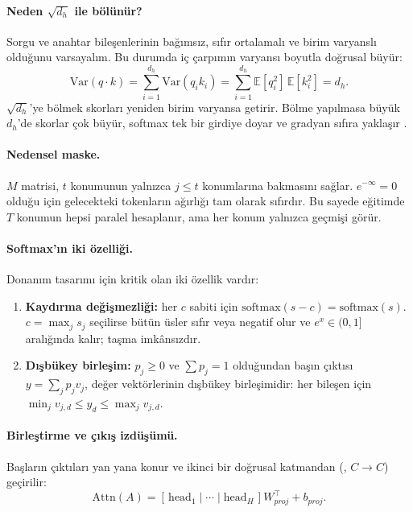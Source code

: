 \paragraph{Neden $\sqrt{d_h}$ ile bölünür?} Sorgu ve anahtar bileşenlerinin bağımsız, sıfır ortalamalı ve birim varyanslı olduğunu varsayalım. Bu durumda iç çarpımın varyansı boyutla doğrusal büyür:
\begin{equation}
  \mathrm{Var}(q \cdot k) = \sum_{i=1}^{d_h} \mathrm{Var}(q_i k_i) = \sum_{i=1}^{d_h} \mathbb{E}[q_i^2]\, \mathbb{E}[k_i^2] = d_h .
\end{equation}
$\sqrt{d_h}$'ye bölmek skorları yeniden birim varyansa getirir. Bölme yapılmasa büyük $d_h$'de skorlar çok büyür, softmax tek bir girdiye doyar ve gradyan sıfıra yaklaşır \cite{vaswani}.

\paragraph{Nedensel maske.} $M$ matrisi, $t$ konumunun yalnızca $j\le t$ konumlarına bakmasını sağlar. $e^{-\infty}=0$ olduğu için gelecekteki tokenların ağırlığı tam olarak sıfırdır. Bu sayede eğitimde $T$ konumun hepsi paralel hesaplanır, ama her konum yalnızca geçmişi görür.

\paragraph{Softmax'ın iki özelliği.} Donanım tasarımı için kritik olan iki özellik vardır:
\begin{enumerate}
  \item \textbf{Kaydırma değişmezliği:} her $c$ sabiti için $\mathrm{softmax}(s-c) = \mathrm{softmax}(s)$. $c = \max_j s_j$ seçilirse bütün üsler sıfır veya negatif olur ve $e^x \in (0,1]$ aralığında kalır; taşma imkânsızdır.
  \item \textbf{Dışbükey birleşim:} $p_j \ge 0$ ve $\sum p_j = 1$ olduğundan başın çıktısı $y = \sum_j p_j v_j$, değer vektörlerinin dışbükey birleşimidir: her bileşen için $\min_j v_{j,d} \le y_d \le \max_j v_{j,d}$.
\end{enumerate}

\paragraph{Birleştirme ve çıkış izdüşümü.} Başların çıktıları yan yana konur ve ikinci bir doğrusal katmandan (, $C\rightarrow C$) geçirilir:
\begin{equation}
  \mathrm{Attn}(A) = \left[\, \mathrm{head}_1 \;|\; \cdots \;|\; \mathrm{head}_H \,\right] W_{proj}^{\top} + b_{proj}.
\end{equation}

